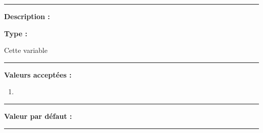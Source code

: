 \documentclass[a4paper,10pt]{article}
\begin{document}
\par\noindent\rule{\textwidth}{0.4pt}

\begin{justify}
    \textbf{Description :}
\end{justify}

\setlength{\parskip}{1em}

\begin{justify}
    \textbf{Type : }
\end{justify}

\setlength{\parskip}{1em}

\begin{justify}
    Cette variable
\end{justify}

\par\noindent\rule{\textwidth}{0.4pt}

\textbf{Valeurs acceptées :}
\begin{enumerate}
    \item
\end{enumerate}

\par\noindent\rule{\textwidth}{0.4pt}

\textbf{Valeur par défaut :}




\color{vars}\par\noindent\rule{\textwidth}{0.4pt}\color{text}\\[1\baselineskip]
\end{document}
